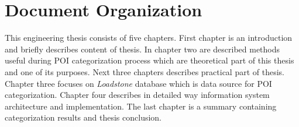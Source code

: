 \section{Document Organization}
This engineering thesis consists of five chapters. First chapter is an introduction and briefly describes content of thesis. In chapter two are described methods useful during POI categorization process which are theoretical part of this thesis and one of its purposes. Next three chapters describes practical part of thesis. Chapter three focuses on \textit{Loadstone} database which is data source for POI categorization. Chapter four describes in detailed way information system architecture and implementation. The last chapter is a summary containing categorization results and thesis conclusion.